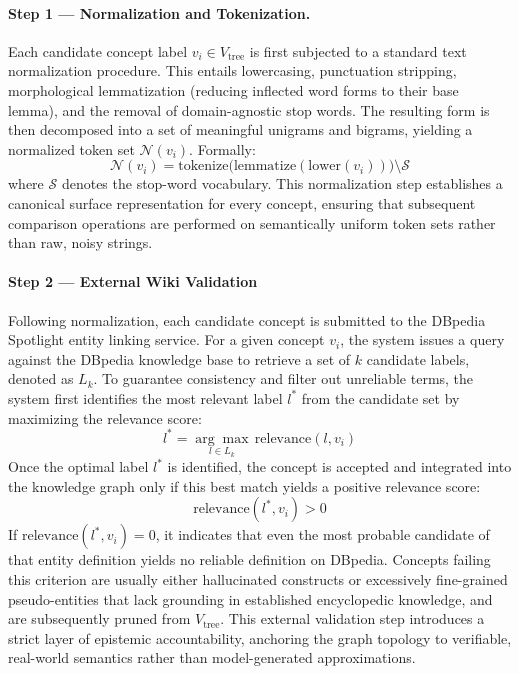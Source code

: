 \paragraph*{Step 1 — Normalization and Tokenization.}

Each candidate concept label $v_i \in V_{\text{tree}}$ is first subjected to a standard text normalization procedure. This entails lowercasing, punctuation stripping, morphological lemmatization (reducing inflected word forms to their base lemma), and the removal of domain-agnostic stop words. The resulting form is then decomposed into a set of meaningful unigrams and bigrams, yielding a normalized token set $\mathcal{N}(v_i)$. Formally:
\begin{equation}
    \mathcal{N}(v_i) = \text{tokenize}\bigl(\text{lemmatize}(\text{lower}(v_i))\bigr) \setminus \mathcal{S}
\end{equation}
where $\mathcal{S}$ denotes the stop-word vocabulary. This normalization step establishes a canonical surface representation for every concept, ensuring that subsequent comparison operations are performed on semantically uniform token sets rather than raw, noisy strings.

\paragraph*{Step 2 — External Wiki Validation}

Following normalization, each candidate concept is submitted to the DBpedia Spotlight entity linking service. For a given concept $v_i$, the system issues a query against the DBpedia knowledge base to retrieve a set of $k$ candidate labels, denoted as $L_k$. 
To guarantee consistency and filter out unreliable terms, the system first identifies the most relevant label $l^*$ from the candidate set by maximizing the relevance score:
\begin{equation}
    l^* = \underset{l \in L_k}{\arg\max} \, \text{relevance}(l, v_i)
\end{equation}
Once the optimal label $l^*$ is identified, the concept is accepted and integrated into the knowledge graph only if this best match yields a positive relevance score:
\begin{equation}
    \text{relevance}(l^*, v_i) > 0
\end{equation}
If $\text{relevance}(l^*, v_i) = 0$, it indicates that even the most probable candidate of that entity definition yields no reliable definition on DBpedia. Concepts failing this 
criterion are usually either hallucinated constructs or excessively fine-grained pseudo-entities that lack grounding in established encyclopedic
 knowledge, and are subsequently pruned from $V_{\text{tree}}$. This external validation step introduces a strict layer of epistemic accountability, 
 anchoring the graph topology to verifiable, real-world semantics rather than model-generated approximations. 


